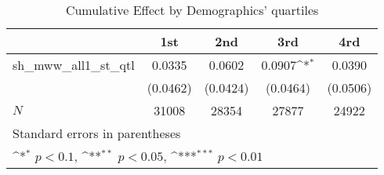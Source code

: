 \begin{table}[htbp]\centering
\def\sym#1{\ifmmode^{#1}\else\(^{#1}\)\fi}
\caption{Cumulative Effect by Demographics' quartiles}
\begin{tabular}{l*{4}{c}}
\hline\hline
            &\multicolumn{1}{c}{1st}&\multicolumn{1}{c}{2nd}&\multicolumn{1}{c}{3rd}&\multicolumn{1}{c}{4rd}\\
\hline
sh\_mww\_all1\_st\_qtl&      0.0335         &      0.0602         &      0.0907\sym{*}  &      0.0390         \\
            &    (0.0462)         &    (0.0424)         &    (0.0464)         &    (0.0506)         \\
\hline
\(N\)       &       31008         &       28354         &       27877         &       24922         \\
\hline\hline
\multicolumn{5}{l}{\footnotesize Standard errors in parentheses}\\
\multicolumn{5}{l}{\footnotesize \sym{*} \(p<0.1\), \sym{**} \(p<0.05\), \sym{***} \(p<0.01\)}\\
\end{tabular}
\end{table}

